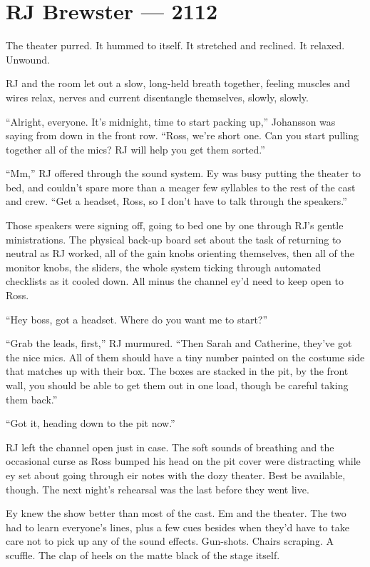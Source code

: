 \hypertarget{rj-brewster-2112}{%
\chapter*{RJ Brewster — 2112}\label{rj-brewster-2112}}

The theater purred. It hummed to itself. It stretched and reclined. It relaxed. Unwound.

RJ and the room let out a slow, long-held breath together, feeling muscles and wires relax, nerves and current disentangle themselves, slowly, slowly.

``Alright, everyone. It's midnight, time to start packing up,'' Johansson was saying from down in the front row. ``Ross, we're short one. Can you start pulling together all of the mics? RJ will help you get them sorted.''

``Mm,'' RJ offered through the sound system. Ey was busy putting the theater to bed, and couldn't spare more than a meager few syllables to the rest of the cast and crew. ``Get a headset, Ross, so I don't have to talk through the speakers.''

Those speakers were signing off, going to bed one by one through RJ's gentle ministrations. The physical back-up board set about the task of returning to neutral as RJ worked, all of the gain knobs orienting themselves, then all of the monitor knobs, the sliders, the whole system ticking through automated checklists as it cooled down. All minus the channel ey'd need to keep open to Ross.

``Hey boss, got a headset. Where do you want me to start?''

``Grab the leads, first,'' RJ murmured. ``Then Sarah and Catherine, they've got the nice mics. All of them should have a tiny number painted on the costume side that matches up with their box. The boxes are stacked in the pit, by the front wall, you should be able to get them out in one load, though be careful taking them back.''

``Got it, heading down to the pit now.''

RJ left the channel open just in case. The soft sounds of breathing and the occasional curse as Ross bumped his head on the pit cover were distracting while ey set about going through eir notes with the dozy theater. Best be available, though. The next night's rehearsal was the last before they went live.

Ey knew the show better than most of the cast. Em and the theater. The two had to learn everyone's lines, plus a few cues besides when they'd have to take care not to pick up any of the sound effects. Gun-shots. Chairs scraping. A scuffle. The clap of heels on the matte black of the stage itself.


